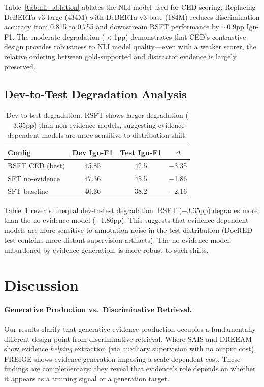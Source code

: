 \documentclass[11pt,a4paper]{article}
\begin{document}
Table~\ref{tab:nli_ablation} ablates the NLI model used for CED scoring. Replacing DeBERTa-v3-large (434M) with DeBERTa-v3-base (184M) reduces discrimination accuracy from 0.815 to 0.755 and downstream RSFT performance by $\sim$0.9pp Ign-F1. The moderate degradation ($<$1pp) demonstrates that CED's contrastive design provides robustness to NLI model quality---even with a weaker scorer, the relative ordering between gold-supported and distractor evidence is largely preserved.

\subsection{Dev-to-Test Degradation Analysis}

\begin{table}[t]
\centering
\small
\begin{tabular}{lccc}
\toprule
\textbf{Config} & \textbf{Dev Ign-F1} & \textbf{Test Ign-F1} & \textbf{$\Delta$} \\
\midrule
RSFT CED (best) & 45.85 & 42.5 & $-$3.35 \\
SFT no-evidence & 47.36 & 45.5 & $-$1.86 \\
SFT baseline & 40.36 & 38.2 & $-$2.16 \\
\bottomrule
\end{tabular}
\caption{Dev-to-test degradation. RSFT shows larger degradation ($-$3.35pp) than non-evidence models, suggesting evidence-dependent models are more sensitive to distribution shift.}
\label{tab:degradation}
\end{table}

Table~\ref{tab:degradation} reveals unequal dev-to-test degradation: RSFT ($-$3.35pp) degrades more than the no-evidence model ($-$1.86pp). This suggests that evidence-dependent models are more sensitive to annotation noise in the test distribution (DocRED test contains more distant supervision artifacts). The no-evidence model, unburdened by evidence generation, is more robust to such shifts.

\section{Discussion}

\paragraph{Generative Production vs.\ Discriminative Retrieval.} Our results clarify that generative evidence production occupies a fundamentally different design point from discriminative retrieval. Where SAIS and DREEAM show evidence \emph{helping} extraction (via auxiliary supervision with no output cost), FREIGE shows evidence generation imposing a scale-dependent cost. These findings are complementary: they reveal that evidence's role depends on whether it appears as a training signal or a generation target.
\end{document}
